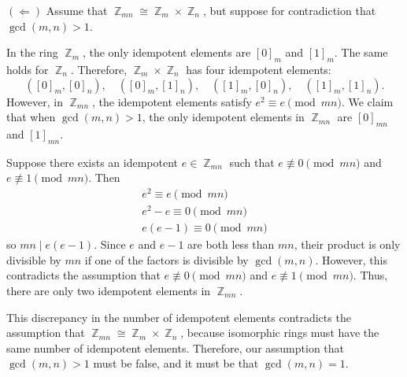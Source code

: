 \documentclass{article}
\DeclareMathOperator{\Z}{\mathbb{Z}}
\begin{document}
\((\Leftarrow)\) Assume that $\Z_{mn} \cong \Z_m \times \Z_n$, but suppose for contradiction that $\gcd(m, n) > 1$.

In the ring $\Z_m$, the only idempotent elements are $[0]_m$ and $[1]_m$. The same holds for $\Z_n$. Therefore, $\Z_m \times \Z_n$ has four idempotent elements:
\[
([0]_m, [0]_n),\quad ([0]_m, [1]_n),\quad ([1]_m, [0]_n),\quad ([1]_m, [1]_n).
\]
However, in $\Z_{mn}$, the idempotent elements satisfy $e^2 \equiv e \pmod{mn}$. We claim that when $\gcd(m, n) > 1$, the only idempotent elements in $\Z_{mn}$ are $[0]_{mn}$ and $[1]_{mn}$.

Suppose there exists an idempotent $e \in \Z_{mn}$ such that $e \not\equiv 0 \pmod{mn}$ and $e \not\equiv 1 \pmod{mn}$. Then
\begin{align*}
    e^2 \equiv e \pmod{mn} \\
    e^2 - e \equiv 0 \pmod{mn} \\
    e(e - 1) \equiv 0 \pmod{mn}
\end{align*}
so $mn \mid e(e - 1)$. Since $e$ and $e - 1$ are both less than $mn$, their product is only divisible by $mn$ if one of the factors is divisible by $\gcd(m, n)$. However, this contradicts the assumption that $e \not\equiv 0 \pmod{mn}$ and $e \not\equiv 1 \pmod{mn}$. Thus, there are only two idempotent elements in $\Z_{mn}$.

This discrepancy in the number of idempotent elements contradicts the assumption that $\Z_{mn} \cong \Z_m \times \Z_n$, because isomorphic rings must have the same number of idempotent elements. Therefore, our assumption that $\gcd(m, n) > 1$ must be false, and it must be that $\gcd(m, n) = 1$.
\end{document}
